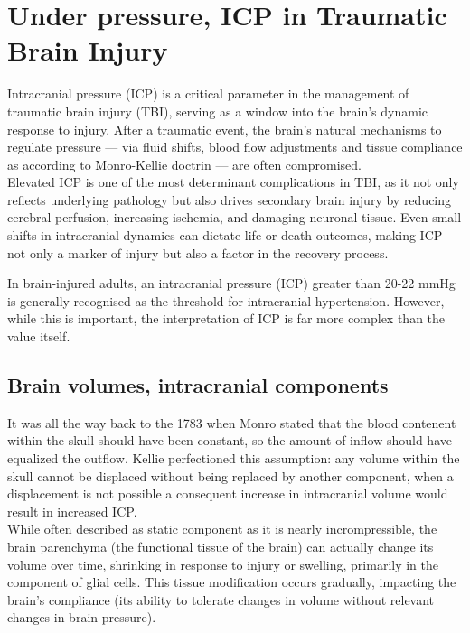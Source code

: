 \chapter[Under pressure, ICP in Traumatic Brain Injury]{Under pressure, ICP in Traumatic Brain Injury}
Intracranial pressure (ICP) is a critical parameter in the management of traumatic brain injury (TBI), serving as a window into the brain’s dynamic response to injury. After a traumatic event, the brain’s natural mechanisms to regulate pressure — via fluid shifts, blood flow adjustments and tissue compliance as according to Monro-Kellie doctrin — are often compromised. \\

Elevated ICP is one of the most determinant complications in TBI, as it not only reflects underlying pathology but also drives secondary brain injury by reducing cerebral perfusion, increasing ischemia, and damaging neuronal tissue. Even small shifts in intracranial dynamics can dictate life-or-death outcomes, making ICP not only a marker of injury but also a factor in the recovery process.

In brain-injured adults, an intracranial pressure (ICP) greater than 20-22 mmHg is generally recognised as the threshold for intracranial hypertension\cite{hawrylukIntracranialPressureCurrent2022a}. However, while this is important, the interpretation of ICP is far more complex than the value itself\cite{cuccioliniIntracranialPressureClinicians2023a}.\\

\section[Brain volumes, intracranial components]{Brain volumes, intracranial components}
It was all the way back to the 1783 when Monro stated that the blood contenent within the skull should have been constant, so the amount of inflow should have equalized the outflow. Kellie perfectioned this assumption: any volume within the skull cannot be displaced without being replaced by another component, when a displacement is not possible a consequent increase in intracranial volume would result in increased ICP.\\

While often described as static component as it is nearly incrompressible, the brain parenchyma (the functional tissue of the brain) can actually change its volume over time, shrinking in response to injury or swelling, primarily in the component of glial cells. This tissue modification occurs gradually, impacting the brain's compliance (its ability to tolerate changes in volume without relevant changes in brain pressure).\\

